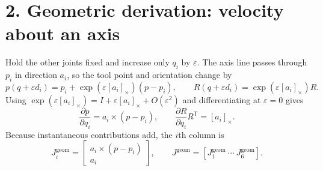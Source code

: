 \documentclass[10pt,a4paper]{article}
\begin{document}
\section*{2. Geometric derivation: velocity about an axis}
Hold the other joints fixed and increase only $q_i$ by $\varepsilon$. The
axis line passes through $p_i$ in direction $a_i$, so the tool point and
orientation change by
\begin{equation}
p(q+\varepsilon d_i)=p_i+\exp(\varepsilon[a_i]_\times)(p-p_i),
\qquad
R(q+\varepsilon d_i)=\exp(\varepsilon[a_i]_\times)R.
\end{equation}
Using $\exp(\varepsilon[a_i]_\times)=I+\varepsilon[a_i]_\times+
O(\varepsilon^2)$ and differentiating at $\varepsilon=0$ gives
\begin{equation}
\frac{\partial p}{\partial q_i}=a_i\times(p-p_i),\qquad
\frac{\partial R}{\partial q_i}R^\mathsf{T}=[a_i]_\times.
\end{equation}
Because instantaneous contributions add, the $i$th column is
\begin{equation}
J_i^{\mathrm{geom}}=
\begin{bmatrix}a_i\times(p-p_i)\\a_i\end{bmatrix},
\qquad J^{\mathrm{geom}}=[J_1^{\mathrm{geom}}\ \cdots\ J_6^{\mathrm{geom}}].
\label{eq:geometric}
\end{equation}
\end{document}
